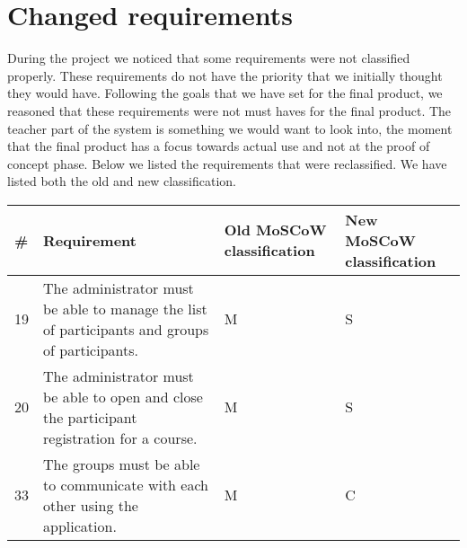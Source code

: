 \section{Changed requirements}
During the project we noticed that some requirements were not classified properly.
These requirements do not have the priority that we initially thought they would have.
Following the goals that we have set for the final product, we reasoned that these requirements were not must haves for the final product.
The teacher part of the system is something we would want to look into, the moment that the final product has a focus towards actual use and not at the proof of concept phase.
Below we listed the requirements that were reclassified.
We have listed both the old and new classification.
\begin{tabular}{ | p{0.5cm} | p{10cm} | p{2cm} | p{2cm} | }
\hline
\textbf{\#} & \textbf{Requirement} & \textbf{Old MoSCoW classification} & \textbf{New MoSCoW classification} \\ \hline
19 & The administrator must be able to manage the list of participants and groups of participants. & M & S \\ \hline
20 & The administrator must be able to open and close the participant registration for a course. & M & S \\ \hline
33 & The groups must be able to communicate with each other using the application. & M & C \\ \hline
\end{tabular}
